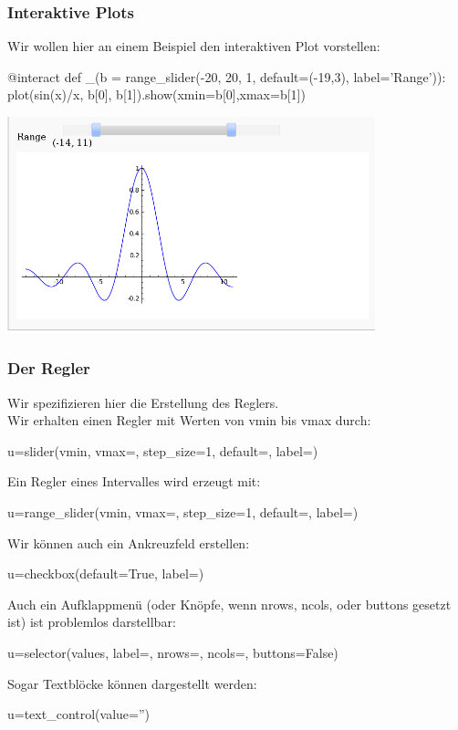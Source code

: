 \documentclass[fontsize=12pt,paper=a4,twoside,bibtotoc,idxtotoc,
liststotoc,pagesize,BCOR1.2cm,DIV15,chapterprefix,pagesize=pdftex]{scrbook}
\theoremstyle{plain}
\theoremstyle{definition}
\theoremstyle{remark}
\begin{document}
\subsubsection{Interaktive Plots}
Wir wollen hier an einem Beispiel den interaktiven Plot vorstellen:
\begin{sagein}
@interact
def _(b = range_slider(-20, 20, 1, default=(-19,3), label='Range')):
    plot(sin(x)/x, b[0], b[1]).show(xmin=b[0],xmax=b[1]) 
\end{sagein}
\begin{center}
\includegraphics[width=0.8\textwidth]{interact_basis.png}
\end{center}
\subsubsection{Der Regler}
Wir spezifizieren hier die Erstellung des Reglers.\\
Wir erhalten einen Regler mit Werten von vmin bis vmax durch:
\begin{sagein}
u=slider(vmin, vmax=, step_size=1, default=, label=) 
\end{sagein}
Ein Regler eines Intervalles wird erzeugt mit:
\begin{sagein}
u=range_slider(vmin, vmax=, step_size=1, default=, label=)
\end{sagein}
Wir können auch ein Ankreuzfeld erstellen:
\begin{sagein}
u=checkbox(default=True, label=)
\end{sagein}
Auch ein Aufklappmenü (oder Knöpfe, wenn nrows, ncols, oder buttons gesetzt ist) ist 
problemlos darstellbar:
\begin{sagein}
u=selector(values, label=, nrows=, ncols=, buttons=False)
\end{sagein}
Sogar Textblöcke können dargestellt werden:
\begin{sagein}
u=text_control(value='')
\end{sagein}
\end{document}
